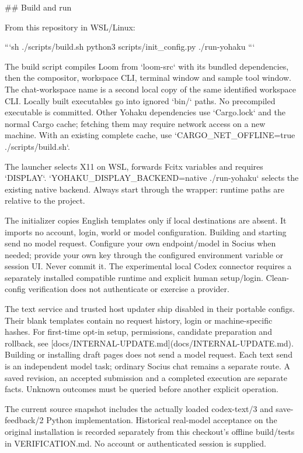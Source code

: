 ## Build and run

From this repository in WSL/Linux:

```sh
./scripts/build.sh
python3 scripts/init_config.py
./run-yohaku
```

The build script compiles Loom from `loom-src` with its bundled dependencies,
then the compositor, workspace CLI, terminal window and sample tool window. The
chat-workspace name is a second local copy of the same identified workspace CLI. Locally built
executables go into ignored `bin/` paths. No precompiled executable is committed.
Other Yohaku dependencies use `Cargo.lock` and the normal Cargo cache; fetching
them may require network access on a new machine. With an existing complete
cache, use `CARGO_NET_OFFLINE=true ./scripts/build.sh`.

The launcher selects X11 on WSL, forwards Fcitx variables and requires `DISPLAY`.
`YOHAKU_DISPLAY_BACKEND=native ./run-yohaku` selects the existing native backend.
Always start through the wrapper: runtime paths are relative to the project.

The initializer copies English templates only if local destinations are absent.
It imports no account, login, world or model configuration. Building and starting
send no model request. Configure your own endpoint/model in Socius when needed;
provide your own key through the configured environment variable or session UI.
Never commit it. The experimental local Codex connector requires a separately
installed compatible runtime and explicit human setup/login. Clean-config
verification does not authenticate or exercise a provider.

The text service and trusted host updater ship disabled in their portable configs.
Their blank templates contain no request history, login or machine-specific hashes.
For first-time opt-in setup, permissions, candidate preparation and rollback, see
[docs/INTERNAL-UPDATE.md](docs/INTERNAL-UPDATE.md). Building or installing draft
pages does not send a model request. Each text send is an independent model task;
ordinary Socius chat remains a separate route. A saved revision, an accepted
submission and a completed execution are separate facts. Unknown outcomes must
be queried before another explicit operation.

The current source snapshot includes the actually loaded codex-text/3 and
save-feedback/2 Python implementation. Historical real-model acceptance on the
original installation is recorded separately from this checkout's offline
build/tests in VERIFICATION.md. No account or authenticated session is supplied.


